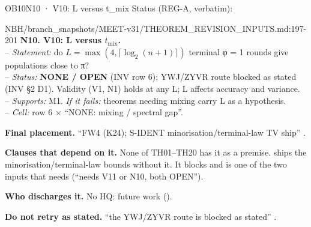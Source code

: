 \begin{card}{OB10}{N10 · V10: L versus t\_mix}
Status (REG-A, verbatim):  
\begin{stmt}{NBH/branch_snapshots/MEET-v31/THEOREM_REVISION_INPUTS.md:197-201}
\textbf{N10. V10: L versus $t_{\mathrm{mix}}$.}\\
– \emph{Statement:} do $L = \max(4, ⌈\log_2(n+1)⌉)$ terminal φ = 1 rounds give populations close to π?\\
– \emph{Status:} \textbf{NONE / OPEN} (INV row 6); YWJ/ZYVR route blocked as stated (INV §2 D1). Validity (V1, N1) holds at any L; L affects accuracy and variance.\\
– \emph{Supports:} M1. \emph{If it fails:} theorems needing mixing carry L as a hypothesis.\\
– \emph{Cell:} row 6 × ``NONE: mixing / spectral gap''.
\end{stmt}
\textbf{Final placement.} ``FW4 (K24); S-IDENT minorisation/terminal-law TV ship'' .

\textbf{Clauses that depend on it.} None of TH01--TH20 has it as a premise.  ships the minorisation/terminal-law bounds without it. It blocks  and is one of the two inputs that  needs (``needs V11 or N10, both OPEN'').

\textbf{Who discharges it.} No HQ: future work ().

\textbf{Do not retry as stated.} ``the YWJ/ZYVR route is blocked as stated'' .
\end{card}

